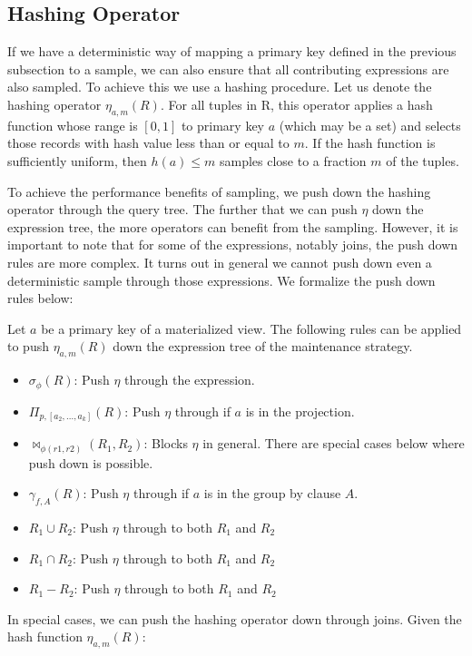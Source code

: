 \subsection{Hashing Operator}
\label{push}
If we have a deterministic way of mapping a primary key defined in the previous subsection to a sample, we can also ensure that all contributing expressions are also sampled. 
To achieve this we use a hashing procedure.
Let us denote the hashing operator $\eta_{a, m}(R)$. 
For all tuples in R, this operator applies a hash function whose range is $[0,1]$ to primary key $a$ (which may be a set) and selects those records with hash value less than or equal to $m$.
If the hash function is sufficiently uniform, then $h(a) \le m$ samples close to a fraction $m$ of the tuples.

To achieve the performance benefits of sampling, we push down the hashing operator through the query tree.
The further that we can push $\eta$ down the expression tree, the more operators can benefit from the sampling.
However, it is important to note that for some of the expressions, notably joins, the push down rules are more complex. 
It turns out in general we cannot push down even a deterministic sample through those expressions.
We formalize the push down rules below:
\begin{definition}
Let $a$ be a primary key of a materialized view. The following rules can be applied to push $\eta_{a, m}(R)$ down the expression tree of the maintenance strategy. 
\begin{itemize}[noitemsep]
\item $\sigma_{\phi}(R)$: Push $\eta$ through the expression.  
\item $\Pi_{p,[a_2,...,a_k]}(R)$: Push $\eta $ through if $a$ is in the projection.
\item $\bowtie_{\phi (r1,r2)}(R_1,R_2)$: Blocks $\eta $ in general. There are special cases below where push down is possible.
\item $\gamma_{f,A}(R)$: Push $\eta $ through if $a$ is in the group by clause $A$.
\item $R_1 \cup R_2$: Push $\eta $ through to both $R_1$ and $R_2$
\item $R_1 \cap R_2$: Push $\eta $ through to both $R_1$ and $R_2$
\item $R_1 - R_2$: Push $\eta $ through to both $R_1$ and $R_2$
\end{itemize}
\end{definition}
In special cases, we can push the hashing operator down through joins. 
Given the hash function $\eta_{a, m}(R)$:

